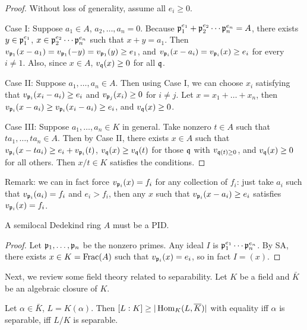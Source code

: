 \documentclass[11pt]{amsart}
\begin{document}
\begin{proof}
Without loss of generality, assume all $e_i \ge 0$.

Case I: Suppose $a_1 \in A$, $a_2,\dots,a_n  = 0$. Because $\mathfrak{p}_1^{e_1} + \mathfrak{p}_2^{e_2}\cdots\mathfrak{p}_n^{e_n} = A$, there exists $y\in \mathfrak{p}_1^{e_1}$, $x\in \mathfrak{p}_2^{e_2}\cdots\mathfrak{p}_n^{e_n}$ such that $x + y = a_1$. Then $v_{\mathfrak{p}_1}(x - a_1) = v_{\mathfrak{p}_1}(-y) = v_{\mathfrak{p}_1}(y) \ge e_1$, and $v_{\mathfrak{p}_i}(x - a_i) = v_{\mathfrak{p}_i}(x) \ge e_i$ for every $i\neq 1$. Also, since $x \in A$, $v_{\mathfrak{q}}(x) \ge 0$ for all $\mathfrak{q}$.

Case II: Suppose $a_1,\dots,a_n\in A$. Then using Case I, we can choose $x_i$ satisfying that $v_{\mathfrak{p}_i}(x_i - a_i) \ge e_i$ and $v_{\mathfrak{p}_j}(x_i) \ge 0$ for $i\neq j$. Let $x = x_1+\dots+x_n$, then $v_{\mathfrak{p}_i}(x - a_i) \ge v_{\mathfrak{p}_i}(x_i - a_i) \ge e_i$, and $v_{\mathfrak{q}}(x) \ge 0$.

Case III: Suppose $a_1,\dots,a_n\in K$ in general. Take nonzero $t\in A$ such that $ta_1,\dots,ta_n \in A$. Then by Case II, there exists $x\in A$ such that $v_{\mathfrak{p}_i}(x - ta_i)\ge e_i + v_{\mathfrak{p}_i}(t)$, $v_{\mathfrak{q}}(x) \ge v_{\mathfrak{q}}(t)$ for those $\mathfrak{q}$ with $v_{\mathfrak{q}(t)\ge 0}$, and $v_{\mathfrak{q}}(x) \ge 0$ for all others. Then $x/t\in K$ satisfies the conditions.
\end{proof}

Remark: we can in fact force $v_{\mathfrak{p}_i}(x) = f_i$ for any collection of $f_i$: just take $a_i$ such that $v_{\mathfrak{p}_i}(a_i) = f_i$ and $e_i > f_i$, then any $x$ such that $v_{\mathfrak{p}_i}(x-a_i) \ge e_i$ satisfies $v_{\mathfrak{p}_i}(x) = f_i$.

\begin{cor}
\label{semilocalDedPID}
A semilocal Dedekind ring $A$ must be a PID.
\end{cor}

\begin{proof}
Let $\mathfrak{p}_1,\dots,\mathfrak{p}_n$ be the nonzero primes. Any ideal $I$ is $\mathfrak{p}_1^{e_1}\cdots\mathfrak{p}_n^{e_n}$. By SA, there exists $x\in K = \operatorname{Frac}(A)$ such that $v_{\mathfrak{p}_i}(x) = e_i$, so in fact $I = (x)$.
\end{proof}

Next, we review some field theory related to separability. Let $K$ be a field and $\bar{K}$ be an algebraic closure of $K$. 

\begin{lem}
Let $\alpha \in \bar{K}$, $L = K(\alpha)$. Then $[L:K] \ge |\operatorname{Hom}_{K}(L, \overline{K})|$ with equality iff $\alpha$ is separable, iff $L/K$ is separable.
\end{lem}
\end{document}
